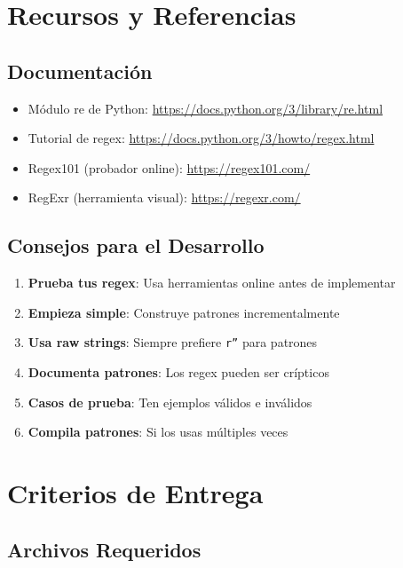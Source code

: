 \documentclass[11pt,letterpaper]{article}
\begin{document}
\section{Recursos y Referencias}

\subsection{Documentación}

\begin{itemize}
    \item Módulo re de Python: \url{https://docs.python.org/3/library/re.html}
    \item Tutorial de regex: \url{https://docs.python.org/3/howto/regex.html}
    \item Regex101 (probador online): \url{https://regex101.com/}
    \item RegExr (herramienta visual): \url{https://regexr.com/}
\end{itemize}

\subsection{Consejos para el Desarrollo}

\begin{enumerate}
    \item \textbf{Prueba tus regex}: Usa herramientas online antes de implementar
    \item \textbf{Empieza simple}: Construye patrones incrementalmente
    \item \textbf{Usa raw strings}: Siempre prefiere \texttt{r''} para patrones
    \item \textbf{Documenta patrones}: Los regex pueden ser crípticos
    \item \textbf{Casos de prueba}: Ten ejemplos válidos e inválidos
    \item \textbf{Compila patrones}: Si los usas múltiples veces
\end{enumerate}

\section{Criterios de Entrega}

\subsection{Archivos Requeridos}
\end{document}
